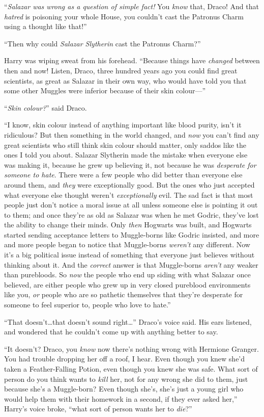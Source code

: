 “\emph{Salazar was wrong as a question of simple fact!} You \emph{know} that, Draco! And that \emph{hatred} is poisoning your whole House, you couldn’t cast the Patronus Charm using a thought like that!”

“Then why could \emph{Salazar Slytherin} cast the Patronus Charm?”

Harry was wiping sweat from his forehead. “Because things have \emph{changed} between then and now! Listen, Draco, three hundred years ago you could find great scientists, as great as Salazar in their own way, who would have told you that some other Muggles were inferior because of their skin colour—”

“\emph{Skin colour?}” said Draco.

“I know, skin colour instead of anything important like blood purity, isn’t it ridiculous? But then something in the world changed, and \emph{now} you can’t find any great scientists who still think skin colour should matter, only saddos like the ones I told you about. Salazar Slytherin made the mistake when everyone else was making it, because he grew up believing it, not because he was \emph{desperate for someone to hate}. There were a few people who did better than everyone else around them, and \emph{they} were exceptionally good. But the ones who just accepted what everyone else thought weren’t \emph{exceptionally} evil. The sad fact is that most people just don’t notice a moral issue at all unless someone else is pointing it out to them; and once they’re as old as Salazar was when he met Godric, they’ve lost the ability to change their minds. Only \emph{then} Hogwarts was built, and Hogwarts started sending acceptance letters to Muggle-borns like Godric insisted, and more and more people began to notice that Muggle-borns \emph{weren’t} any different. Now it’s a big political issue instead of something that everyone just believes without thinking about it. And the \emph{correct} answer is that Muggle-borns \emph{aren’t} any weaker than purebloods. So \emph{now} the people who end up siding with what Salazar once believed, are either people who grew up in very closed pureblood environments like you, \emph{or} people who are so pathetic themselves that they’re desperate for someone to feel superior to, people who love to hate.”

“That doesn’t…that doesn’t sound right…” Draco’s voice said. His ears listened, and wondered that he couldn’t come up with anything better to say.

“It doesn’t? Draco, you \emph{know} now there’s nothing wrong with Hermione Granger. You had trouble dropping her off a roof, I hear. Even though you knew she’d taken a Feather-Falling Potion, even though you knew she was safe. What sort of person do you think wants to \emph{kill} her, not for any wrong she did to them, just because she’s a Muggle-born? Even though she’s, she’s just a young girl who would help them with their homework in a second, if they ever asked her,” Harry’s voice broke, “what sort of person wants her to \emph{die}?”

